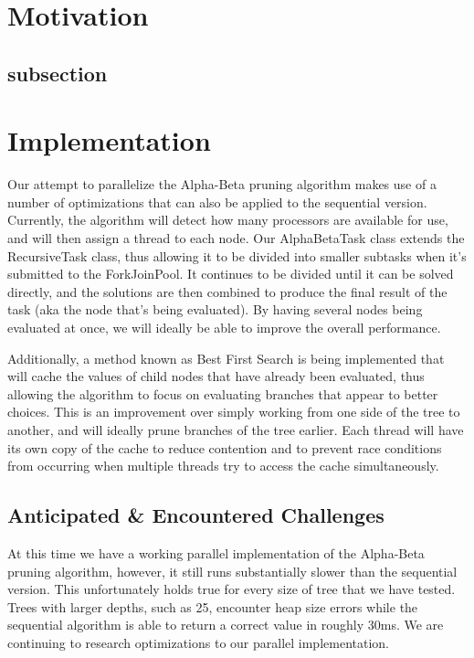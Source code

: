 \documentclass[conference]{IEEEtran}
\begin{document}
\section{Motivation}

\subsection{subsection}

\section{Implementation}
Our attempt to parallelize the Alpha-Beta pruning algorithm makes use of a number of optimizations that can also be applied to the sequential version. Currently, the algorithm will detect how many processors are available for use, and will then assign a thread to each node. Our AlphaBetaTask class extends the RecursiveTask class, thus allowing it to be divided into smaller subtasks when it’s submitted to the ForkJoinPool. It continues to be divided until it can be solved directly, and the solutions are then combined to produce the final result of the task (aka the node that’s being evaluated). By having several nodes being evaluated at once, we will ideally be able to improve the overall performance.\vspace{10pt}

Additionally, a method known as Best First Search is being implemented that will cache the values of child nodes that have already been evaluated, thus allowing the algorithm to focus on evaluating branches that appear to better choices. This is an improvement over simply working from one side of the tree to another, and will ideally prune branches of the tree earlier. Each thread will have its own copy of the cache to reduce contention and to prevent race conditions from occurring when multiple threads try to access the cache simultaneously.

\subsection{Anticipated & Encountered Challenges}
At this time we have a working parallel implementation of the Alpha-Beta pruning algorithm, however, it still runs substantially slower than the sequential version. This unfortunately holds true for every size of tree that we have tested. Trees with larger depths, such as 25, encounter heap size errors while the sequential algorithm is able to return a correct value in roughly 30ms. We are continuing to research optimizations to our parallel implementation.
\end{document}
